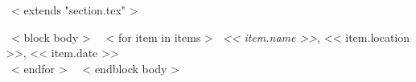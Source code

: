 ~< extends "section.tex" >~

~< block body >~
  ~< for item in items >~
    {\it << item.name >>}, << item.location >>, << item.date >> \\
  ~< endfor >~
\vspace{-.15in}
~< endblock body >~
